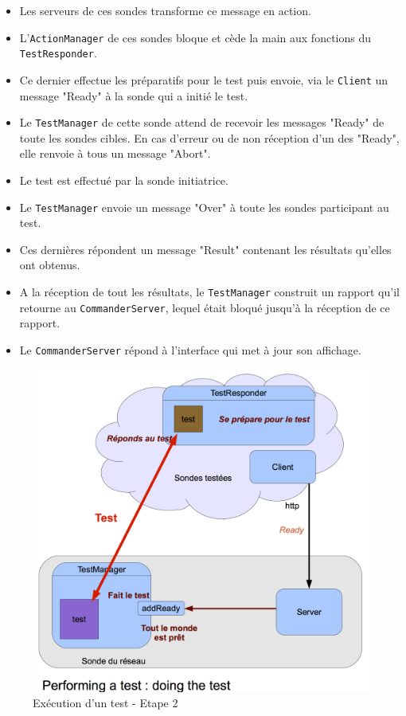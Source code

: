 \documentclass[a4paper,11pt]{article}
\begin{document}
\begin{itemize}
\item Les serveurs de ces sondes transforme ce message en action.
\item L'\texttt{ActionManager} de ces sondes bloque et cède la main aux fonctions du \texttt{TestResponder}.
\item Ce dernier effectue les préparatifs pour le test puis envoie, via le \texttt{Client} un message "Ready" à la sonde qui a initié le test.
\item Le \texttt{TestManager} de cette sonde attend de recevoir les messages "Ready" de toute les sondes cibles. En cas d'erreur ou de non réception d'un des "Ready", elle renvoie à tous un message "Abort".
\item Le test est effectué par la sonde initiatrice.
\item Le \texttt{TestManager} envoie un message "Over" à toute les sondes participant au test.
\item Ces dernières répondent un message "Result" contenant les résultats qu'elles ont obtenus.
\item A la réception de tout les résultats, le \texttt{TestManager} construit un rapport qu'il retourne au \texttt{CommanderServer}, lequel était bloqué jusqu'à la réception de ce rapport.
\item Le \texttt{CommanderServer} répond à l'interface qui met à jour son affichage.
\end{itemize}

\begin{figure}[!ht]
\centering\includegraphics[width=0.8\linewidth]{img/graphTest2.png}
\caption{Exécution d'un test - Etape 2}
\end{figure}
\end{document}
